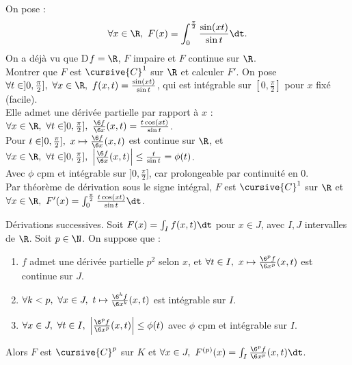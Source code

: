 \documentclass[11pt]{article}
\begin{document}
\begin{ex}{}{}
    On pose :
    \begin{equation*}
        \forall x \in \R, ~ F(x) = \int_0^{\frac{\pi}{2}}\frac{\sin(xt)}{\sin t}\dt.
    \end{equation*}
    On a déjà vu que D$f=\R$, $F$ impaire et $F$ continue sur $\R$.\\
    Montrer que $F$ est $\cursive{C}^1$ sur $\R$ et calculer $F'$.
    \tcblower
    On pose $\forall t \in ]0,\frac{\pi}{2}], ~ \forall x \in \R, ~ f(x,t)=\frac{\sin(xt)}{\sin t}$, qui est intégrable sur $[0,\frac{\pi}{2}]$ pour $x$ fixé (facile).\\
    Elle admet une dérivée partielle par rapport à $x$ : $\forall x \in \R, ~ \forall t \in ]0,\frac{\pi}{2}], ~ \frac{\6 f}{\6 x}(x,t) = \frac{t\cos(xt)}{\sin t}$.\\
    Pour $t\in]0,\frac{\pi}{2}], ~ x\mapsto\frac{\6 f}{\6 x}(x,t)$ est continue sur $\R$, et $\forall x \in \R, ~ \forall t \in ]0,\frac{\pi}{2}], ~ \left|\frac{\6 f}{\6 x}(x,t)\right|\leq\frac{t}{\sin t}=\phi(t)$.\\
    Avec $\phi$ cpm et intégrable sur $]0,\frac{\pi}{2}]$, car prolongeable par continuité en 0.\\
    Par théorème de dérivation sous le signe intégral, $F$ est $\cursive{C}^1$ sur $\R$ et $\forall x \in \R, ~ F'(x) = \int_0^{\frac{\pi}{2}}\frac{t\cos(xt)}{\sin t}\dt$.
\end{ex}

\begin{thm}{Dérivations successives.}{}
    Soit $F(x)=\int_I f(x,t)\dt$ pour $x\in J$, avec $I,J$ intervalles de $\R$. Soit $p\in\N$. On suppose que :
    \begin{enumerate}
        \item $f$ admet une dérivée partielle $p^2$ selon $x$, et $\forall t \in I, ~ x\mapsto \frac{\6^p f}{\6 x^p}(x,t)$ est continue sur $J$.
        \item $\forall k < p, ~ \forall x \in J, ~ t\mapsto \frac{\6^k f}{\6 x^k}(x,t)$ est intégrable sur $I$.
        \item $\forall x \in J, ~ \forall t \in I, ~ \left|\frac{\6^p f}{\6 x^p}(x,t)\right|\leq\phi(t)$ avec $\phi$ cpm et intégrable sur $I$.
    \end{enumerate}
    Alors $F$ est $\cursive{C}^p$ sur $K$ et $\forall x \in J, ~ F^{(p)}(x)=\int_I \frac{\6^p f}{\6 x^p}(x,t)\dt$.
\end{thm}

\pagebreak
\end{document}
